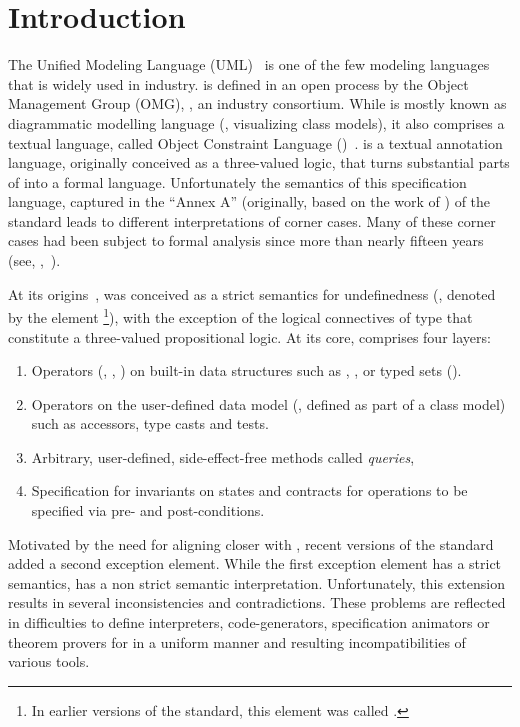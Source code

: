 \section{Introduction}
\isatagafp%
The Unified Modeling Language
(UML)~\cite{omg:uml-infrastructure:2011,omg:uml-superstructure:2011}
is one of the few modeling languages that is widely used in
industry. \UML is defined in an open process by the Object Management
Group (OMG), \ie, an industry consortium.  While \UML is mostly known
as diagrammatic modelling language (\eg, visualizing class models), it
also comprises a textual language, called Object Constraint Language
(\OCL)~\cite{omg:ocl:2012}. \OCL is a textual annotation language,
originally conceived as a three-valued logic, that turns substantial
parts of \UML into a formal language.  Unfortunately the semantics of
this specification language, captured in the ``Annex A'' (originally,
based on the work of \citet{richters:precise:2002}) of the \OCL
standard leads to different interpretations of corner cases.  Many of
these corner cases had been subject to formal analysis since more than
nearly fifteen years (see,
\eg,~\cite{brucker.ea:semantic:2006-b,brucker.ea:proposal:2002,mandel.ea:ocl:1999,
  hamie.ea:reflections:1998,cook.ea::amsterdam:2002}).

At its origins~\cite{richters:precise:2002,omg:ocl:1997}, \OCL was
conceived as a strict semantics for undefinedness (\eg, denoted by the
element \footnote{In earlier versions of the \OCL
  standard, this element was called .}), with
the exception of the logical connectives of type 
that constitute a three-valued propositional logic. At its core, \OCL
comprises four layers:
\begin{enumerate}
\item Operators (\eg, , \inlineocl{_ + _}) on
  built-in data structures such as ,
  , or typed sets ().
\item Operators on the user-defined data model (\eg, defined as part
  of a \UML class model) such as accessors, type casts and tests.
\item Arbitrary, user-defined, side-effect-free methods called \emph{queries},
\item Specification for invariants on states and contracts for
  operations to be specified via pre- and post-conditions.
\end{enumerate}

Motivated by the need for aligning \OCL closer with \UML, recent
versions of the \OCL standard~\cite{omg:ocl:2006,omg:ocl:2012} added a
second exception element.  While the first exception element
 has a strict semantics,  has a non
strict semantic interpretation.  Unfortunately, this extension results
in several inconsistencies and contradictions. These problems are
reflected in difficulties to define interpreters, code-generators,
specification animators or theorem provers for \OCL in a uniform manner
and resulting incompatibilities of various tools.

